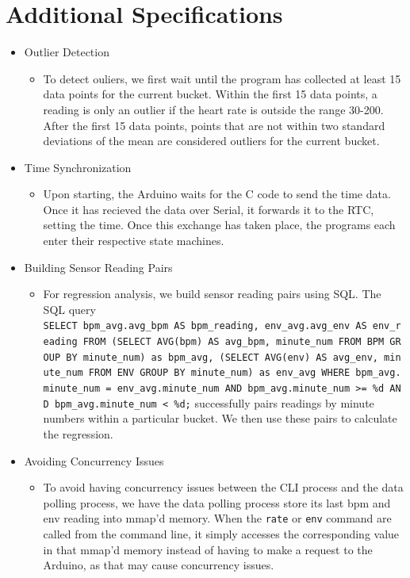 \documentclass[]{article}
\providecommand{\tightlist}{%
  \setlength{\itemsep}{0pt}\setlength{\parskip}{0pt}}
\begin{document}
\section{Additional Specifications}\label{additional-specifications}

\begin{itemize}
\tightlist
\item
  Outlier Detection

  \begin{itemize}
  \tightlist
  \item
    To detect ouliers, we first wait until the program has collected at
    least 15 data points for the current bucket. Within the first 15
    data points, a reading is only an outlier if the heart rate is
    outside the range 30-200. After the first 15 data points, points
    that are not within two standard deviations of the mean are
    considered outliers for the current bucket.
  \end{itemize}
\item
  Time Synchronization

  \begin{itemize}
  \tightlist
  \item
    Upon starting, the Arduino waits for the C code to send the time
    data. Once it has recieved the data over Serial, it forwards it to
    the RTC, setting the time. Once this exchange has taken place, the
    programs each enter their respective state machines.
  \end{itemize}
\item
  Building Sensor Reading Pairs

  \begin{itemize}
  \tightlist
  \item
    For regression analysis, we build sensor reading pairs using SQL.
    The SQL query
    \texttt{SELECT\ bpm\_avg.avg\_bpm\ AS\ bpm\_reading,\ env\_avg.avg\_env\ AS\ env\_reading\ FROM\ (SELECT\ AVG(bpm)\ AS\ avg\_bpm,\ minute\_num\ FROM\ BPM\ GROUP\ BY\ minute\_num)\ as\ bpm\_avg,\ (SELECT\ AVG(env)\ AS\ avg\_env,\ minute\_num\ FROM\ ENV\ GROUP\ BY\ minute\_num)\ as\ env\_avg\ WHERE\ bpm\_avg.minute\_num\ =\ env\_avg.minute\_num\ AND\ bpm\_avg.minute\_num\ \textgreater{}=\ \%d\ AND\ bpm\_avg.minute\_num\ \textless{}\ \%d;}
    successfully pairs readings by minute numbers within a particular
    bucket. We then use these pairs to calculate the regression.
  \end{itemize}
\item
  Avoiding Concurrency Issues

  \begin{itemize}
  \tightlist
  \item
    To avoid having concurrency issues between the CLI process and the
    data polling process, we have the data polling process store its
    last bpm and env reading into mmap'd memory. When the \texttt{rate}
    or \texttt{env} command are called from the command line, it simply
    accesses the corresponding value in that mmap'd memory instead of
    having to make a request to the Arduino, as that may cause
    concurrency issues.
  \end{itemize}
\end{itemize}
\end{document}
